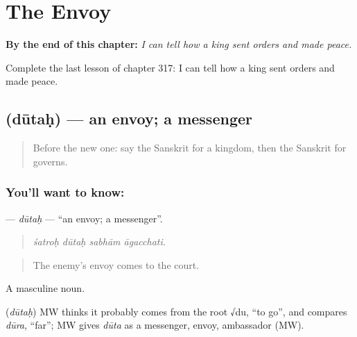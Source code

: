 
\chapter{The Envoy}
\label{ch:sa-the-envoy}

\begin{chapteropening}
\textbf{By the end of this chapter:} \emph{I can tell how a king sent orders and made peace.}

Complete the last lesson of chapter 317: I can tell how a king sent orders and made peace.
\end{chapteropening}

\section[\texorpdfstring{\sk{दूतः} (dūtaḥ)}{दूतः (dūtaḥ)}]{ (dūtaḥ) — an envoy; a messenger}

\label{lesson:SA-C317-dutah}



\begin{quote}
Before the new one: say the Sanskrit for a kingdom, then the Sanskrit for governs.
\end{quote}

\subsection*{You'll want to know: }
\textbf{} — \emph{dūtaḥ} — \textquotedblleft{}an envoy; a messenger\textquotedblright{}.

\begin{quote}
   
\end{quote}

\begin{quote}
\emph{śatroḥ dūtaḥ sabhām āgacchati.}
\end{quote}

\begin{quote}
The enemy's envoy comes to the court.
\end{quote}

A masculine noun.

\begin{cousinweb}
\textbf{} (\emph{dūtaḥ}) MW thinks it probably comes from the root √du, \textquotedblleft{}to go\textquotedblright{}, and compares \emph{dūra}, \textquotedblleft{}far\textquotedblright{}; MW gives \emph{dūta} as a messenger, envoy, ambassador (MW).
\end{cousinweb}

